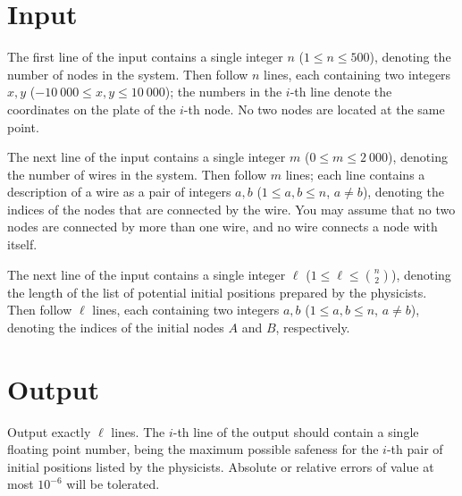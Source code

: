 \section*{Input}

The first line of the input contains a single integer $n$ ($1\leq n\leq 500$), denoting the number of nodes in the system. Then follow $n$ lines, each containing two integers $x,y$ ($-10\ 000\leq x,y\leq 10\ 000$); the numbers in the $i$-th line denote the coordinates on the plate of the $i$-th node. No two nodes are located at the same point.

The next line of the input contains a single integer $m$ ($0\leq m\leq 2\ 000$), denoting the number of wires in the system. Then follow $m$ lines; each line contains a description of a wire as a pair of integers $a,b$ ($1\leq a,b\leq n$, $a\neq b$), denoting the indices of the nodes that are connected by the wire. You may assume that no two nodes are connected by more than one wire, and no wire connects a node with itself.

The next line of the input contains a single integer $\ell$ ($1\leq \ell\leq \binom{n}{2}$), denoting the length of the list of potential initial positions prepared by the physicists. Then follow $\ell$ lines, each containing two integers $a,b$ ($1\leq a,b\leq n$, $a\neq b$), denoting the indices of the initial nodes $A$ and $B$, respectively.

\section*{Output}

Output exactly $\ell$ lines. The $i$-th line of the output should contain a single floating point number, being the maximum possible safeness for the $i$-th pair of initial positions listed by the physicists. Absolute or relative errors of value at most $10^{-6}$ will be tolerated.

